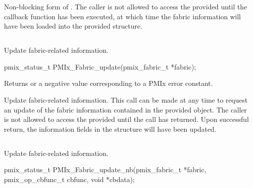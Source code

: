 \descr

Non-blocking form of . The caller is not allowed to access the provided  until the callback function has been executed, at which time the fabric information will have been loaded into the provided structure.

\subsection{}

\summary

Update fabric-related information.

\format

\cspecificstart
\begin{codepar}
pmix_status_t
PMIx_Fabric_update(pmix_fabric_t *fabric);
\end{codepar}
\cspecificend

\begin{arglist}
\end{arglist}

Returns  or a negative value corresponding to a \ac{PMIx} error constant.

\descr

Update fabric-related information. This call can be made at any time to request an update of the fabric information contained in the provided  object. The caller is not allowed to access the provided  until the call has returned. Upon successful return, the information fields in the  structure will have been updated.


\subsection{}

\summary

Update fabric-related information.

\format

\cspecificstart
\begin{codepar}
pmix_status_t
PMIx_Fabric_update_nb(pmix_fabric_t *fabric,
                      pmix_op_cbfunc_t cbfunc, void *cbdata);
\end{codepar}
\cspecificend


